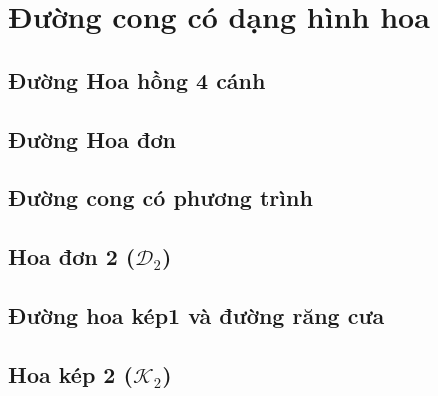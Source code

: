 \chapter{Đường cong có dạng hình hoa}
\section{Đường Hoa hồng 4 cánh}
\section{Đường Hoa đơn}
\section{Đường cong có phương trình}
\section{Hoa đơn 2 ($\mathcal D_2$)}
\section{Đường hoa kép1 và đường răng cưa}
\section{Hoa kép 2 ($\mathcal K_2$)}